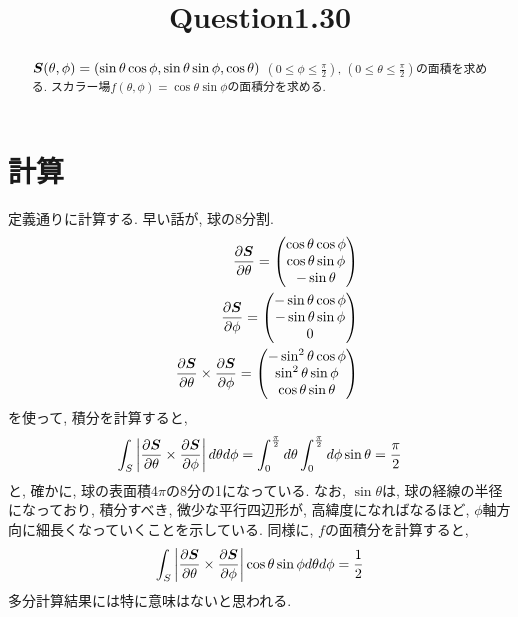 \documentclass{jsarticle} \usepackage[dvipdfmx]{graphicx} \usepackage[dvipdfmx]{hyperref}
\title{Question1.30}
\newcommand*{\mbold}[1]{\mbox{\boldmath $#1$}}
\begin{document}
\maketitle

\begin{abstract}
  $\mbold{S}(\theta, \phi) = (\sin\theta \cos\phi, \sin\theta \sin\phi, \cos\theta)$ $(0 \leq \phi \leq \frac{\pi}{2})$, $(0 \leq \theta \leq \frac{\pi}{2})$の面積を求める. スカラー場$f(\theta, \phi) = \cos\theta \sin\phi$の面積分を求める.
\end{abstract}

\section*{計算}
定義通りに計算する. 早い話が, 球の8分割. 
\begin{eqnarray}
  && \frac{\partial \mbold{S}}{\partial \theta} = 
  \begin{pmatrix}
    \cos\theta \cos\phi \\
    \cos\theta \sin\phi \\
    -\sin\theta\\
  \end{pmatrix}
  \nonumber \\
  && \frac{\partial \mbold{S}}{\partial \phi} = 
  \begin{pmatrix}
    -\sin\theta \cos\phi \\
    -\sin\theta \sin\phi \\
    0 \\
  \end{pmatrix}
  \nonumber \\
  && \frac{\partial \mbold{S}}{\partial \theta} \times \frac{\partial \mbold{S}}{\partial \phi} = 
  \begin{pmatrix}
    -\sin^2\theta \cos\phi \\
    \sin^2\theta \sin\phi \\
    \cos\theta \sin\theta \\
  \end{pmatrix}
\end{eqnarray}
を使って, 積分を計算すると, 
\begin{eqnarray}
  \int_S \left| \frac{\partial \mbold{S}}{\partial \theta} \times \frac{\partial \mbold{S}}{\partial \phi} \right|d\theta d\phi = 
  \int_0^{\frac{\pi}{2}}d\theta \int_0^{\frac{\pi}{2}}d\phi \sin\theta 
  = \frac{\pi}{2}
\end{eqnarray}
と, 確かに, 球の表面積$4\pi$の8分の1になっている. 
なお, $\sin\theta$は, 球の経線の半径になっており, 積分すべき, 微少な平行四辺形が, 高緯度になればなるほど, $\phi$軸方向に細長くなっていくことを示している. 
同様に, $f$の面積分を計算すると, 
\begin{eqnarray}
  \int_S \left| \frac{\partial \mbold{S}}{\partial \theta} \times \frac{\partial \mbold{S}}{\partial \phi} \right| \cos\theta \sin\phi d\theta d\phi 
  = \frac{1}{2}
\end{eqnarray}
多分計算結果には特に意味はないと思われる. 
\end{document}
